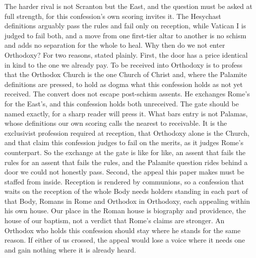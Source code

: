 \documentclass[11pt,twoside]{article}
\newcommand{\unit}[1]{\needspace{3\baselineskip}\par\medskip{\normalfont\bfseries\color{subhead}#1}\par\nobreak\smallskip}
\begin{document}
\unit{Why not Orthodoxy.}
The harder rival is not Scranton but the East, and the question must be asked at full strength, for this confession's own scoring invites it. The Hesychast definitions arguably pass the rules and fail only on reception, while Vatican I is judged to fail both, and a move from one first-tier altar to another is no schism and adds no separation for the whole to heal. Why then do we not enter Orthodoxy? For two reasons, stated plainly. First, the door has a price identical in kind to the one we already pay. To be received into Orthodoxy is to profess that the Orthodox Church is the one Church of Christ and, where the Palamite definitions are pressed, to hold as dogma what this confession holds as not yet received. The convert does not escape post-schism assents. He exchanges Rome's for the East's, and this confession holds both unreceived. The gate should be named exactly, for a sharp reader will press it. What bars entry is not Palamas, whose definitions our own scoring calls the nearest to receivable. It is the exclusivist profession required at reception, that Orthodoxy alone is the Church, and that claim this confession judges to fail on the merits, as it judges Rome's counterpart. So the exchange at the gate is like for like, an assent that fails the rules for an assent that fails the rules, and the Palamite question rides behind a door we could not honestly pass. Second, the appeal this paper makes must be staffed from inside. Reception is rendered by communions, so a confession that waits on the reception of the whole Body needs holders standing in each part of that Body, Romans in Rome and Orthodox in Orthodoxy, each appealing within his own house. Our place in the Roman house is biography and providence, the house of our baptism, not a verdict that Rome's claims are stronger. An Orthodox who holds this confession should stay where he stands for the same reason. If either of us crossed, the appeal would lose a voice where it needs one and gain nothing where it is already heard.
\end{document}
